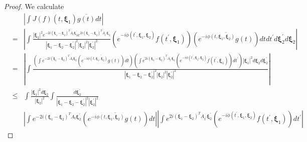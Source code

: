 \documentclass[reqno]{amsart}
\theoremstyle{plain}
\numberwithin{equation}{section}
\begin{document}
\begin{proof}
We calculate\begin{eqnarray*}
&&\left\vert \int J(f)(t,\mathbf{\xi }_{1})\overline{g(t)}dt\right\vert \\
&=&\left\vert \int \frac{\left\vert \mathbf{\xi }_{1}\right\vert
^{2}e^{-2i\left( \mathbf{\xi }_{1}-\mathbf{\xi }_{2}\right) ^{T}A_{t}\mathbf{\xi }_{2}^{\prime }}e^{2i\left( \mathbf{\xi }_{1}-\mathbf{\xi }_{2}\right)
^{T}A_{t^{\prime }}\mathbf{\xi }_{2}^{\prime }}}{\left\vert \mathbf{\xi }_{1}-\mathbf{\xi }_{2}-\mathbf{\xi }_{2}^{\prime }\right\vert ^{2}\left\vert 
\mathbf{\xi }_{2}\right\vert ^{2}\left\vert \mathbf{\xi }_{2}^{\prime
}\right\vert ^{2}}\left( e^{-i\phi (t^{\prime },\mathbf{\xi }_{1},\mathbf{\xi }_{2})}f(t^{\prime },\mathbf{\xi }_{1})\right) \left( \overline{e^{-i\phi (t,\mathbf{\xi }_{1},\mathbf{\xi }_{2})}g(t)}\right) dtdt^{\prime
}d\mathbf{\xi }_{2}^{\prime }d\mathbf{\xi }_{2}\right\vert \\
&=&\left\vert \int \frac{\left( \int e^{-2i\left( \mathbf{\xi }_{1}-\mathbf{\xi }_{2}\right) ^{T}A_{t}\mathbf{\xi }_{2}^{\prime }}\left( \overline{e^{-i\phi (t,\mathbf{\xi }_{1},\mathbf{\xi }_{2})}g(t)}\right) dt\right)
\left( \int e^{2i\left( \mathbf{\xi }_{1}-\mathbf{\xi }_{2}\right)
^{T}A_{t^{\prime }}\mathbf{\xi }_{2}}\left( e^{-i\phi (t^{\prime },\mathbf{\xi }_{1},\mathbf{\xi }_{2})}f(t^{\prime },\mathbf{\xi }_{1})\right)
dt^{\prime }\right) \left\vert \mathbf{\xi }_{1}\right\vert ^{2}d\mathbf{\xi 
}_{2}d\mathbf{\xi }_{2}^{\prime }}{\left\vert \mathbf{\xi }_{1}-\mathbf{\xi }_{2}-\mathbf{\xi }_{2}^{\prime }\right\vert ^{2}\left\vert \mathbf{\xi }_{2}\right\vert ^{2}\left\vert \mathbf{\xi }_{2}^{\prime }\right\vert ^{2}}\right\vert \\
&\leqslant &\int \frac{\left\vert \mathbf{\xi }_{1}\right\vert ^{2}d\mathbf{\xi }_{2}}{\left\vert \mathbf{\xi }_{2}\right\vert ^{2}}\int \frac{d\mathbf{\xi }_{2}^{\prime }}{\left\vert \mathbf{\xi }_{1}-\mathbf{\xi }_{2}-\mathbf{\xi }_{2}^{\prime }\right\vert ^{2}\left\vert \mathbf{\xi }_{2}^{\prime
}\right\vert ^{2}} \\
&&\left\vert \int e^{-2i\left( \mathbf{\xi }_{1}-\mathbf{\xi }_{2}\right)
^{T}A_{t}\mathbf{\xi }_{2}^{\prime }}\left( \overline{e^{-i\phi (t,\mathbf{\xi }_{1},\mathbf{\xi }_{2})}g(t)}\right) dt\right\vert \left\vert \int
e^{2i\left( \mathbf{\xi }_{1}-\mathbf{\xi }_{2}\right) ^{T}A_{t^{\prime }}\mathbf{\xi }_{2}^{\prime }}\left( e^{-i\phi (t^{\prime },\mathbf{\xi }_{1},\mathbf{\xi }_{2})}f(t^{\prime },\mathbf{\xi }_{1})\right) dt^{\prime
}\right\vert

\end{eqnarray*}
\end{proof}
\end{document}
